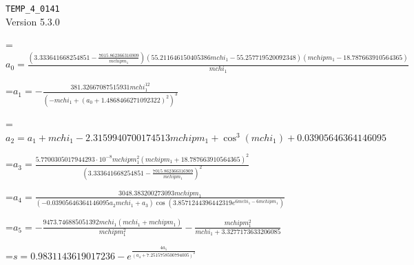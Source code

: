 \documentclass{article}
\newcommand{\exprline}[1]{\par\noindent\begingroup\setbox0=\hbox{$\displaystyle #1$}\ifdim\wd0>\linewidth\resizebox{\linewidth}{!}{\box0}\else\box0\fi\endgroup\par\medskip}
\begin{document}
\noindent\texttt{TEMP\_4\_0141}\\
Version 5.3.0\\
\exprline{a_{0} = \frac{\left(3.333641668254851 - \frac{7015.862366316909}{mchipm_{1}}\right) \left(55.211646150405386 mchi_{1} - 55.257719520092348\right) \left(mchipm_{1} - 18.787663910564365\right)}{mchi_{1}}}
\exprline{a_{1} = - \frac{381.32667087515931 mchi_{1}^{12}}{\left(- mchi_{1} + \left(a_{0} + 1.4868466271092322\right)^{2}\right)^{3}}}
\exprline{a_{2} = a_{1} + mchi_{1} - 2.3159940700174513 mchipm_{1} + \cos^{3}{\left(mchi_{1} \right)} + 0.03905646364146095}
\exprline{a_{3} = \frac{5.7700305017944293 \cdot 10^{-8} mchipm_{1}^{2} \left(mchipm_{1} + 18.787663910564365\right)^{2}}{\left(3.333641668254851 - \frac{7015.862366316909}{mchipm_{1}}\right)^{2}}}
\exprline{a_{4} = \frac{3048.383200273093 mchipm_{1}}{\left(- 0.03905646364146095 a_{2} mchi_{1} + a_{3}\right) \cos{\left(3.8571244396442319 e^{6 mchi_{1} - 6 mchipm_{1}} \right)}}}
\exprline{a_{5} = - \frac{9473.746885051392 mchi_{1} \left(mchi_{1} + mchipm_{1}\right)}{mchipm_{1}^{2}} - \frac{mchipm_{1}^{2}}{mchi_{1} + 3.3277173633206085}}
\exprline{s = 0.9831143619017236 - e^{\frac{4 a_{5}}{\left(a_{4} + 7.2515758500794005\right)^{2}}}}
\end{document}
